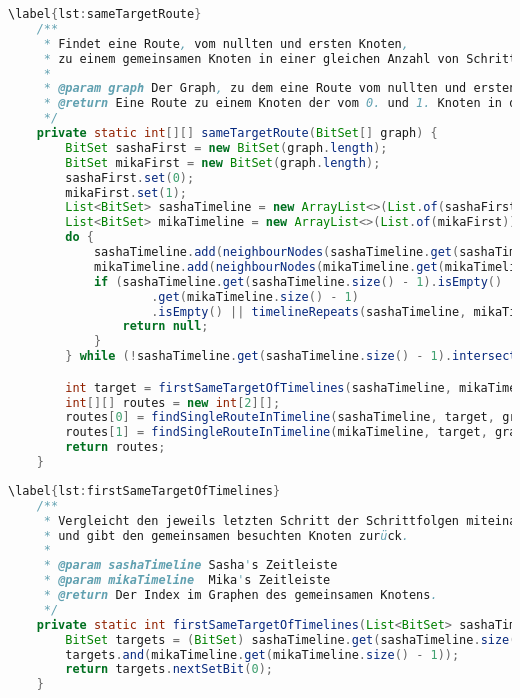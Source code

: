 \documentclass[a4paper,10pt,ngerman]{scrartcl}
\begin{document}
    \begin{lstlisting}[frame=single,language=Java,title=Methode sameTargetRoute,breaklines=true]
    \label{lst:sameTargetRoute}
    /**
     * Findet eine Route, vom nullten und ersten Knoten,
     * zu einem gemeinsamen Knoten in einer gleichen Anzahl von Schritten.
     *
     * @param graph Der Graph, zu dem eine Route vom nullten und ersten Knoten zu einem gemeinsamen Knoten gebildet werden soll.
     * @return Eine Route zu einem Knoten der vom 0. und 1. Knoten in der gleichen Anzahl von Schritten erreichbar ist.
     */
    private static int[][] sameTargetRoute(BitSet[] graph) {
        BitSet sashaFirst = new BitSet(graph.length);
        BitSet mikaFirst = new BitSet(graph.length);
        sashaFirst.set(0);
        mikaFirst.set(1);
        List<BitSet> sashaTimeline = new ArrayList<>(List.of(sashaFirst));
        List<BitSet> mikaTimeline = new ArrayList<>(List.of(mikaFirst));
        do {
            sashaTimeline.add(neighbourNodes(sashaTimeline.get(sashaTimeline.size() - 1), graph));
            mikaTimeline.add(neighbourNodes(mikaTimeline.get(mikaTimeline.size() - 1), graph));
            if (sashaTimeline.get(sashaTimeline.size() - 1).isEmpty() || mikaTimeline
                    .get(mikaTimeline.size() - 1)
                    .isEmpty() || timelineRepeats(sashaTimeline, mikaTimeline)) {
                return null;
            }
        } while (!sashaTimeline.get(sashaTimeline.size() - 1).intersects(mikaTimeline.get(mikaTimeline.size() - 1)));

        int target = firstSameTargetOfTimelines(sashaTimeline, mikaTimeline);
        int[][] routes = new int[2][];
        routes[0] = findSingleRouteInTimeline(sashaTimeline, target, graph);
        routes[1] = findSingleRouteInTimeline(mikaTimeline, target, graph);
        return routes;
    }
    \end{lstlisting}


    \begin{lstlisting}[frame=single,language=Java,title=Methode firstSameTargetOfTimelines,breaklines=true]
    \label{lst:firstSameTargetOfTimelines}
    /**
     * Vergleicht den jeweils letzten Schritt der Schrittfolgen miteinander
     * und gibt den gemeinsamen besuchten Knoten zurück.
     *
     * @param sashaTimeline Sasha's Zeitleiste
     * @param mikaTimeline  Mika's Zeitleiste
     * @return Der Index im Graphen des gemeinsamen Knotens.
     */
    private static int firstSameTargetOfTimelines(List<BitSet> sashaTimeline, List<BitSet> mikaTimeline) {
        BitSet targets = (BitSet) sashaTimeline.get(sashaTimeline.size() - 1).clone();
        targets.and(mikaTimeline.get(mikaTimeline.size() - 1));
        return targets.nextSetBit(0);
    }
    \end{lstlisting}
\end{document}
